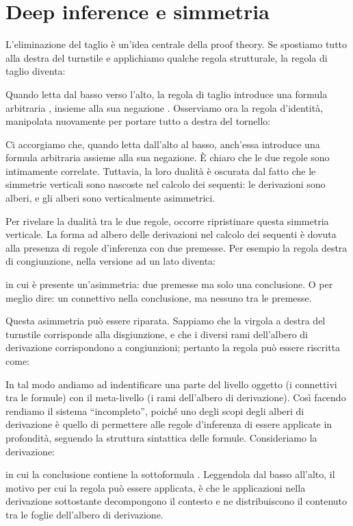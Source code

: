 \documentclass[12pt,a4paper,openright,twoside]{report}
\begin{document}
\section{Deep inference e simmetria} 
L'eliminazione del taglio \`e un'idea centrale della proof theory. Se spostiamo tutto alla destra del turnstile e applichiamo qualche regola strutturale, la regola di taglio diventa:

Quando letta dal basso verso l'alto, la regola di taglio introduce una formula arbitraria , insieme alla sua negazione . Osserviamo ora la regola d'identit\`a, manipolata nuovamente per portare tutto a destra del tornello:

Ci accorgiamo che, quando letta dall'alto al basso, anch'essa introduce una formula arbitraria assieme alla sua negazione. \`E chiaro che le due regole sono intimamente correlate. Tuttavia, la loro dualit\`a \`e oscurata dal fatto che le simmetrie verticali sono nascoste nel calcolo dei sequenti: le derivazioni sono alberi, e gli alberi sono verticalmente asimmetrici.

Per rivelare la dualit\`a tra le due regole, occorre ripristinare questa simmetria verticale. La forma ad albero delle derivazioni nel calcolo dei sequenti \`e dovuta alla presenza di regole d'inferenza con due premesse. Per esempio la regola destra di congiunzione, nella versione ad un lato diventa:

in cui \`e presente un'asimmetria: due premesse ma solo una conclusione. O per meglio dire: un connettivo nella conclusione, ma nessuno tra le premesse.

Questa asimmetria pu\`o essere riparata. Sappiamo che la virgola a destra del turnstile corrisponde alla disgiunzione, e che i diversi rami dell'albero di derivazione corrispondono a congiunzioni; pertanto la regola  pu\`o essere riscritta come:


In tal modo andiamo ad indentificare una parte del livello oggetto (i connettivi tra le formule) con il meta-livello (i rami dell'albero di derivazione). Cos\`i facendo rendiamo il sistema ``incompleto'', poich\'e uno degli scopi degli alberi di derivazione \`e quello di permettere alle regole d'inferenza di essere applicate in profondit\`a, seguendo la struttura sintattica delle formule. Consideriamo la derivazione:

in cui la conclusione contiene la sottoformula . Leggendola dal basso all'alto, il motivo per cui la regola  pu\`o essere applicata, \`e che le applicazioni nella derivazione sottostante decompongono il contesto  e ne distribuiscono il contenuto tra le foglie dell'albero di derivazione.
\end{document}
